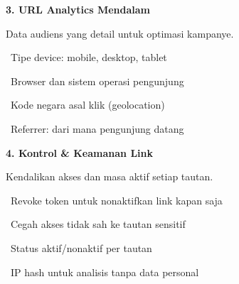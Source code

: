 \documentclass[a4paper]{article}
\begin{document}
\vspace{8pt}

\noindent
\begin{minipage}[t]{0.485\textwidth}
    \colorbox{EmeraldPrimary}{%
        \begin{minipage}{\dimexpr\textwidth-14pt}
            \vspace{5pt}
            {\fontsize{10}{13}\selectfont\bfseries\color{White} 3. URL Analytics Mendalam}
            \vspace{5pt}
        \end{minipage}}
    \vspace{5pt}
    {\fontsize{9}{12}\selectfont\color{TextDark}%
    Data audiens yang detail untuk optimasi kampanye.\par\vspace{3pt}
    \textbullet\ Tipe device: mobile, desktop, tablet\par\vspace{2pt}%
    \textbullet\ Browser dan sistem operasi pengunjung\par\vspace{2pt}%
    \textbullet\ Kode negara asal klik (geolocation)\par\vspace{2pt}%
    \textbullet\ Referrer: dari mana pengunjung datang}%
\end{minipage}%
\hfill
\begin{minipage}[t]{0.485\textwidth}
    \colorbox{PurplePrimary}{%
        \begin{minipage}{\dimexpr\textwidth-14pt}
            \vspace{5pt}
            {\fontsize{10}{13}\selectfont\bfseries\color{White} 4. Kontrol \& Keamanan Link}
            \vspace{5pt}
        \end{minipage}}
    \vspace{5pt}
    {\fontsize{9}{12}\selectfont\color{TextDark}%
    Kendalikan akses dan masa aktif setiap tautan.\par\vspace{3pt}
    \textbullet\ Revoke token untuk nonaktifkan link kapan saja\par\vspace{2pt}%
    \textbullet\ Cegah akses tidak sah ke tautan sensitif\par\vspace{2pt}%
    \textbullet\ Status aktif/nonaktif per tautan\par\vspace{2pt}%
    \textbullet\ IP hash untuk analisis tanpa data personal}%
\end{minipage}
\end{document}
